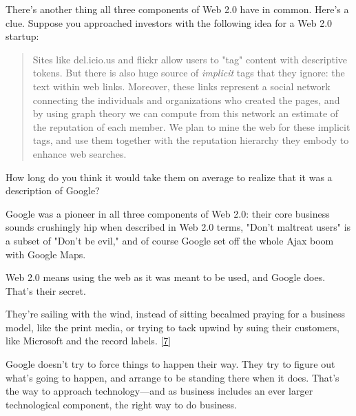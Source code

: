 There's another thing all three
                  components of Web 2.0 have in common. Here's a clue. Suppose
                  you approached investors with the following idea for a Web 2.0
                  startup:
                  \begin{quote}

                    Sites like del.icio.us and flickr allow users to "tag"
                    content with descriptive tokens. But there is also huge
                    source of
                    \emph{implicit} tags that they ignore: the text within web
                    links. Moreover, these links represent a social network
                    connecting the individuals and organizations who created the
                    pages, and by using graph theory we can compute from this
                    network an estimate of the reputation of each member. We
                    plan to mine the web for these implicit tags, and use them
                    together with the reputation hierarchy they embody to
                    enhance web searches.
                  
\end{quote}

                  How long do you think it would take them on average to realize
                  that it was a description of Google?

Google was a
                  pioneer in all three components of Web 2.0: their core
                  business sounds crushingly hip when described in Web 2.0
                  terms, "Don't maltreat users" is a subset of "Don't be evil,"
                  and of course Google set off the whole Ajax boom with Google
                  Maps.

Web 2.0 means using the web as it was meant
                  to be used, and Google does. That's their secret.
                  
                  They're sailing with the wind, instead of sitting becalmed
                  praying for a business model, like the print media, or trying
                  to tack upwind by suing their customers, like Microsoft and
                  the record labels.
                  [\href{\#f7n}{7}]

Google doesn't try to force things to happen
                  their way. They try to figure out what's going to happen, and
                  arrange to be standing there when it does. That's the way to
                  approach technology---and as business includes an ever
                  larger technological component, the right way to do
                  business.

